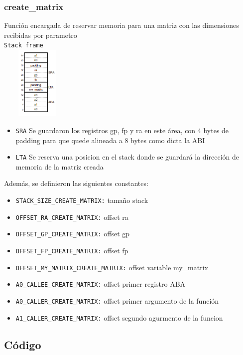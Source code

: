 \documentclass[a4paper,10pt, spanish]{article}
\begin{document}
\subsubsection{create\_matrix}
    Función encargada de reservar memoria para una matriz con las dimensiones recibidas por parametro \\
    \lstinline{Stack frame} \\
            \includegraphics[max height=100pt,max width=100pt]{./stack_create_matrix.png}
            \begin{itemize}
                \item \lstinline{SRA}
                Se guardaron los registros gp, fp y ra en este área, con 4 bytes de padding para que quede alineada a 8 bytes como dicta la ABI
                \item \lstinline{LTA}
                Se reserva una posicion en el stack donde se guardará la dirección de memoria de la matriz creada
            \end{itemize}
     Además, se definieron las siguientes constantes:
        \begin{itemize}
            \item \lstinline{STACK_SIZE_CREATE_MATRIX:} tamaño stack
            \item \lstinline{OFFSET_RA_CREATE_MATRIX:} offset ra
            \item \lstinline{OFFSET_GP_CREATE_MATRIX:} offset gp
            \item \lstinline{OFFSET_FP_CREATE_MATRIX:} offset fp
            \item \lstinline{OFFSET_MY_MATRIX_CREATE_MATRIX:} offset variable my\_matrix
            \item \lstinline{A0_CALLEE_CREATE_MATRIX:} offset primer registro ABA
            \item \lstinline{A0_CALLER_CREATE_MATRIX:} offset primer argumento de la función
            \item \lstinline{A1_CALLER_CREATE_MATRIX:} offset segundo agurmento de la funcion
        \end{itemize}


\subsection{Código}
\end{document}
